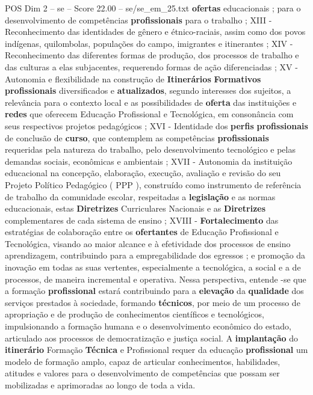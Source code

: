 \begin{textsample}{POS Dim 2 – se – Score 22.00 – se/se\_em\_25.txt}
\textbf{ofertas} educacionais ; para o desenvolvimento de competências \textbf{profissionais} para o trabalho ; XIII - Reconhecimento das identidades de gênero e étnico-raciais, assim como dos povos indígenas, quilombolas, populações do campo, imigrantes e itinerantes ; XIV - Reconhecimento das diferentes formas de produção, dos processos de trabalho e das culturas a elas subjacentes, requerendo formas de ação diferenciadas ; XV - Autonomia e flexibilidade na construção de \textbf{Itinerários} \textbf{Formativos} \textbf{profissionais} diversificados e \textbf{atualizados}, segundo interesses dos sujeitos, a relevância para o contexto local e as possibilidades de \textbf{oferta} das instituições e \textbf{redes} que oferecem Educação Profissional e Tecnológica, em consonância com seus respectivos projetos pedagógicos ; XVI - Identidade dos \textbf{perfis} \textbf{profissionais} de conclusão de \textbf{curso}, que contemplem as competências \textbf{profissionais} requeridas pela natureza do trabalho, pelo desenvolvimento tecnológico e pelas demandas sociais, econômicas e ambientais ; XVII - Autonomia da instituição educacional na concepção, elaboração, execução, avaliação e revisão do seu Projeto Político Pedagógico ( PPP ), construído como instrumento de referência de trabalho da comunidade escolar, respeitadas a \textbf{legislação} e as normas educacionais, estas \textbf{Diretrizes} Curriculares Nacionais e as \textbf{Diretrizes} complementares de cada sistema de ensino ; XVIII - \textbf{Fortalecimento} das estratégias de colaboração entre os \textbf{ofertantes} de Educação Profissional e Tecnológica, visando ao maior alcance e à efetividade dos processos de ensino aprendizagem, contribuindo para a empregabilidade dos egressos ; e promoção da inovação em todas as suas vertentes, especialmente a tecnológica, a social e a de processos, de maneira incremental e operativa.
Nessa perspectiva, entende -se que a formação \textbf{profissional} estará contribuindo para a \textbf{elevação} da \textbf{qualidade} dos serviços prestados à sociedade, formando \textbf{técnicos}, por meio de um processo de apropriação e de produção de conhecimentos científicos e tecnológicos, impulsionando a formação humana e o desenvolvimento econômico do estado, articulado aos processos de democratização e justiça social.
A \textbf{implantação} do \textbf{itinerário} Formação \textbf{Técnica} e Profissional requer da educação \textbf{profissional} um modelo de formação amplo, capaz de articular conhecimentos, habilidades, atitudes e valores para o desenvolvimento de competências que possam ser mobilizadas e aprimoradas ao longo de toda a vida.

\end{textsample}

